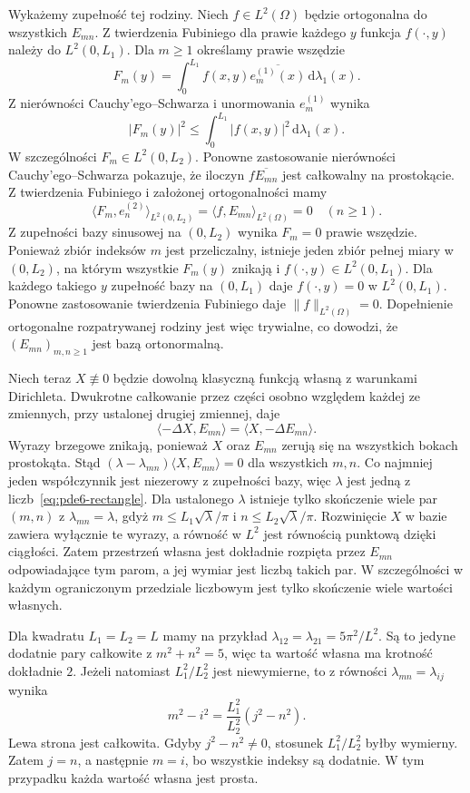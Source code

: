 Wykażemy zupełność tej rodziny. Niech $f\in L^2(\Omega)$
będzie ortogonalna do wszystkich $E_{mn}$.
Z twierdzenia Fubiniego dla prawie każdego $y$
funkcja $f(\cdot,y)$ należy do $L^2(0,L_1)$.
Dla $m\ge1$ określamy prawie wszędzie
\[
 F_m(y)=\int_0^{L_1} f(x,y)\overline{e_m^{(1)}(x)}
 \,\mathrm d\lambda_1(x).
\]
Z nierówności Cauchy'ego--Schwarza i unormowania
$e_m^{(1)}$ wynika
\[
 |F_m(y)|^2\le
 \int_0^{L_1}|f(x,y)|^2\,\mathrm d\lambda_1(x).
\]
W szczególności $F_m\in L^2(0,L_2)$.
Ponowne zastosowanie nierówności Cauchy'ego--Schwarza
pokazuje, że iloczyn $f\overline{E_{mn}}$ jest
całkowalny na prostokącie.
Z twierdzenia Fubiniego i założonej ortogonalności mamy
\[
 \langle F_m,e_n^{(2)}\rangle_{L^2(0,L_2)}
 =\langle f,E_{mn}\rangle_{L^2(\Omega)}=0
 \quad(n\ge1).
\]
Z zupełności bazy sinusowej na $(0,L_2)$ wynika
$F_m=0$ prawie wszędzie. Ponieważ zbiór indeksów $m$
jest przeliczalny, istnieje jeden zbiór pełnej miary
w $(0,L_2)$, na którym wszystkie $F_m(y)$ znikają
i $f(\cdot,y)\in L^2(0,L_1)$.
Dla każdego takiego $y$ zupełność bazy na $(0,L_1)$
daje $f(\cdot,y)=0$ w $L^2(0,L_1)$.
Ponowne zastosowanie twierdzenia Fubiniego daje
$\|f\|_{L^2(\Omega)}=0$. Dopełnienie ortogonalne
rozpatrywanej rodziny jest więc trywialne, co
dowodzi, że $(E_{mn})_{m,n\ge1}$ jest bazą ortonormalną.

Niech teraz $X\not\equiv0$ będzie dowolną klasyczną
funkcją własną z warunkami Dirichleta.
Dwukrotne całkowanie przez części osobno względem
każdej ze zmiennych, przy ustalonej drugiej zmiennej,
daje
\[
 \langle-\Delta X,E_{mn}\rangle
 =\langle X,-\Delta E_{mn}\rangle.
\]
Wyrazy brzegowe znikają, ponieważ $X$ oraz $E_{mn}$
zerują się na wszystkich bokach prostokąta.
Stąd $(\lambda-\lambda_{mn})\langle X,E_{mn}\rangle=0$
dla wszystkich $m,n$. Co najmniej jeden współczynnik
jest niezerowy z zupełności bazy, więc $\lambda$
jest jedną z liczb~\eqref{eq:pde6-rectangle}.
Dla ustalonego $\lambda$ istnieje tylko skończenie
wiele par $(m,n)$ z $\lambda_{mn}=\lambda$, gdyż
$m\le L_1\sqrt\lambda/\pi$ i $n\le L_2\sqrt\lambda/\pi$.
Rozwinięcie $X$ w bazie zawiera wyłącznie te wyrazy,
a równość w $L^2$ jest równością punktową dzięki
ciągłości. Zatem przestrzeń własna jest dokładnie
rozpięta przez $E_{mn}$ odpowiadające tym parom,
a jej wymiar jest liczbą takich par.
W szczególności w każdym ograniczonym przedziale
liczbowym jest tylko skończenie wiele wartości własnych.

\begin{uwaga}
Dla kwadratu $L_1=L_2=L$ mamy na przykład
$\lambda_{12}=\lambda_{21}=5\pi^2/L^2$.
Są to jedyne dodatnie pary całkowite z $m^2+n^2=5$,
więc ta wartość własna ma krotność dokładnie $2$.
Jeżeli natomiast $L_1^2/L_2^2$ jest niewymierne,
to z równości $\lambda_{mn}=\lambda_{ij}$ wynika
\[
 m^2-i^2=\frac{L_1^2}{L_2^2}(j^2-n^2).
\]
Lewa strona jest całkowita. Gdyby $j^2-n^2\ne0$,
stosunek $L_1^2/L_2^2$ byłby wymierny. Zatem
$j=n$, a następnie $m=i$, bo wszystkie indeksy
są dodatnie. W tym przypadku każda wartość własna
jest prosta.
\end{uwaga}

